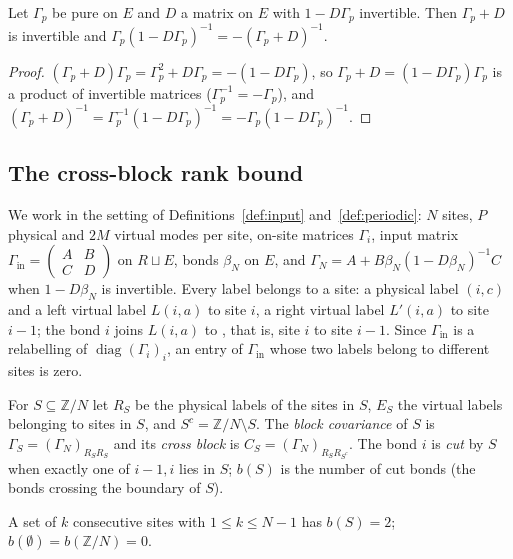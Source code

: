 \begin{lemma}\label{lem:pure-inverse}
Let $\Gamma_p$ be pure on $E$ and $D$ a matrix on $E$ with $1-D\Gamma_p$ invertible. Then
$\Gamma_p+D$ is invertible and $\Gamma_p(1-D\Gamma_p)^{-1}=-(\Gamma_p+D)^{-1}$.
\end{lemma}
\begin{proof}
$(\Gamma_p+D)\Gamma_p=\Gamma_p^2+D\Gamma_p=-(1-D\Gamma_p)$, so
$\Gamma_p+D=(1-D\Gamma_p)\Gamma_p$ is a product of invertible matrices ($\Gamma_p^{-1}=-\Gamma_p$),
and $(\Gamma_p+D)^{-1}=\Gamma_p^{-1}(1-D\Gamma_p)^{-1}=-\Gamma_p(1-D\Gamma_p)^{-1}$.
\end{proof}

\subsection{The cross-block rank bound}
We work in the setting of Definitions~\ref{def:input} and~\ref{def:periodic}: $N$ sites, $P$
physical and $2M$ virtual modes per site, on-site matrices $\Gamma_i$, input matrix
$\Gamma_{\mathrm{in}}=\begin{pmatrix}A&B\\C&D\end{pmatrix}$ on $R\sqcup E$, bonds $\beta_N$ on
$E$, and $\Gamma_N=A+B\beta_N(1-D\beta_N)^{-1}C$ when $1-D\beta_N$ is invertible. Every label
belongs to a site: a physical label $(i,c)$ and a left virtual label $L(i,a)$ to site $i$, a
right virtual label $L'(i,a)$ to site $i-1$; the bond $i$ joins $L(i,a)$ to , that
is, site $i$ to site $i-1$. Since $\Gamma_{\mathrm{in}}$ is a relabelling of
$\operatorname{diag}(\Gamma_i)_i$, an entry of $\Gamma_{\mathrm{in}}$ whose two labels belong to
different sites is zero.

\begin{definition}\label{def:siteset}
For $S\subseteq\mathbb Z/N$ let $R_S$ be the physical labels of the sites in $S$, $E_S$ the
virtual labels belonging to sites in $S$, and $S^c=\mathbb Z/N\setminus S$. The \emph{block
covariance} of $S$ is $\Gamma_S=(\Gamma_N)_{R_SR_S}$ and its \emph{cross block} is
$C_S=(\Gamma_N)_{R_SR_{S^c}}$. The bond $i$ is \emph{cut} by $S$ when exactly one of $i-1,i$
lies in $S$; $b(S)$ is the number of cut bonds (the bonds crossing the boundary of $S$).
\end{definition}
A set of $k$ consecutive sites with $1\leq k\leq N-1$ has $b(S)=2$; $b(\emptyset)=b(\mathbb Z/N)=0$.

